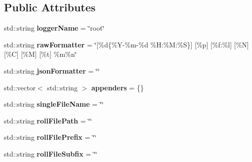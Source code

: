\subsection*{Public Attributes}
\begin{DoxyCompactItemize}
\item 
\mbox{\label{structDAQ_1_1LogConfigStruct_ab948e358d42cab3534f52c6d464e3205}} 
std\+::string {\bfseries logger\+Name} = \char`\"{}root\char`\"{}
\item 
\mbox{\label{structDAQ_1_1LogConfigStruct_acb572d1b30b60c398719da2206f2f0a0}} 
std\+::string {\bfseries raw\+Formatter} = \char`\"{}\mbox{[}\%d\{\%Y-\/\%m-\/\%d \%H\+:\%M\+:\%S\}\mbox{]} \mbox{[}\%p\mbox{]} \mbox{[}\%f\+:\%l\mbox{]} \mbox{[}\%N\mbox{]} \mbox{[}\%C\mbox{]} \mbox{[}\%M\mbox{]} \mbox{[}\%t\mbox{]} \%m\%n\char`\"{}
\item 
\mbox{\label{structDAQ_1_1LogConfigStruct_a332ffa3a006dbe8ee60645da34d64edb}} 
std\+::string {\bfseries json\+Formatter} = \char`\"{}\char`\"{}
\item 
\mbox{\label{structDAQ_1_1LogConfigStruct_a5ae502d0102edc777976250527b73f5a}} 
std\+::vector$<$ std\+::string $>$ {\bfseries appenders} = \{\}
\item 
\mbox{\label{structDAQ_1_1LogConfigStruct_aee2d0bbac80dcf03b4d04b6724d6e118}} 
std\+::string {\bfseries single\+File\+Name} = \char`\"{}\char`\"{}
\item 
\mbox{\label{structDAQ_1_1LogConfigStruct_aaeb19edb8ed2c9f1e6b456dfcb29a724}} 
std\+::string {\bfseries roll\+File\+Path} = \char`\"{}\char`\"{}
\item 
\mbox{\label{structDAQ_1_1LogConfigStruct_a3266726493a8597e0013cfdbc4d6eaab}} 
std\+::string {\bfseries roll\+File\+Prefix} = \char`\"{}\char`\"{}
\item 
\mbox{\label{structDAQ_1_1LogConfigStruct_a2dab7965d72f1f7447ea2b85f107ef7d}} 
std\+::string {\bfseries roll\+File\+Subfix} = \char`\"{}\char`\"{}
\item 

\end{DoxyCompactItemize}

